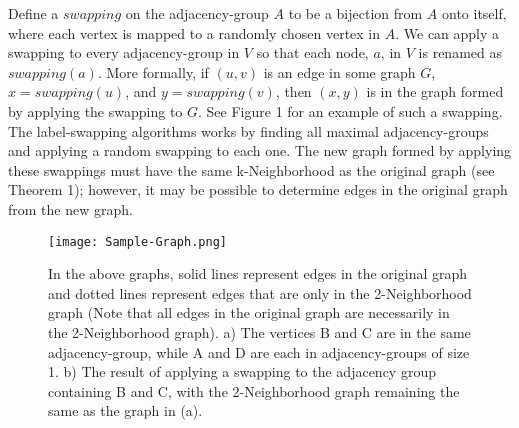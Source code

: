 \documentclass[11pt]{article}
\begin{document}

\indent Define a $swapping$ on the adjacency-group $A$ to be a bijection from $A$ onto itself, where each vertex is mapped to a randomly chosen vertex in $A$. We can apply a swapping to every adjacency-group in $V$ so that each node, $a$, in $V$ is renamed as $swapping(a)$. More formally, if $(u,v)$ is an edge in some graph $G$, $x=swapping(u)$, and $y=swapping(v)$, then $(x,y)$ is in the graph formed by applying the swapping to $G$. See Figure 1 for an example of such a swapping.\\

\indent The label-swapping algorithms works by finding all maximal adjacency-groups and applying a random swapping to each one. The new graph formed by applying these swappings must have the same k-Neighborhood as the original graph (see Theorem 1); however, it may be possible to determine edges in the original graph from the new graph.
\\

\begin{figure}[htb]
\centering
\texttt{[image: Sample-Graph.png]}
\caption{In the above graphs, solid lines represent edges in the original graph and dotted lines represent edges that are only in the 2-Neighborhood graph (Note that all edges in the original graph are necessarily in the 2-Neighborhood graph). a)  The vertices B and C are in the same adjacency-group, while A and D are each in adjacency-groups of size 1. b) The result of applying a swapping to the adjacency group containing B and C, with the 2-Neighborhood graph remaining the same as the graph in (a).}
\label{fig:sample graph}
\end{figure}
\end{document}
